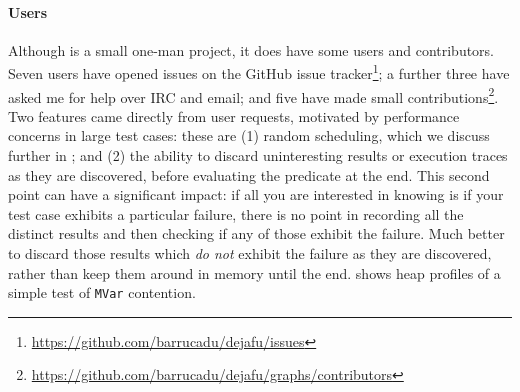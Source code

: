 \paragraph{Users}
Although \dejafu{} is a small one-man project, it does have some users
and contributors.  Seven users have opened issues on the GitHub issue
tracker\footnote{\url{https://github.com/barrucadu/dejafu/issues}}; a
further three have asked me for help over IRC and email; and five have
made small
contributions\footnote{\url{https://github.com/barrucadu/dejafu/graphs/contributors}}.
Two features came directly from user requests, motivated by
performance concerns in large test cases: these are (1) random
scheduling, which we discuss further in ; and (2)
the ability to discard uninteresting results or execution traces as
they are discovered, before evaluating the predicate at the end.  This
second point can have a significant impact: if all you are interested
in knowing is if your test case exhibits a particular failure, there
is no point in recording all the distinct results and then checking if
any of those exhibit the failure.  Much better to discard those
results which \emph{do not} exhibit the failure as they are
discovered, rather than keep them around in memory until the end.
 shows heap profiles of a simple test of \verb|MVar|
contention.

